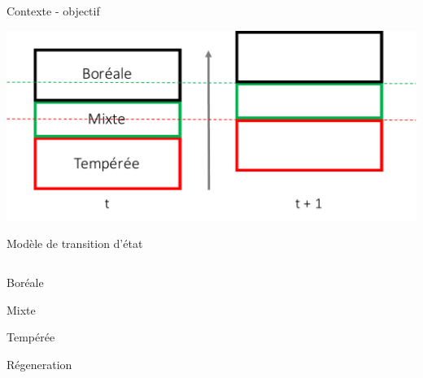 \documentclass[11pt, compress, aspectratio=1610]{beamer}
\providecommand{\tightlist}{%
  \setlength{\itemsep}{0pt}\setlength{\parskip}{0pt}}
\newcommand{\begincols}{\begin{columns}}
\newcommand{\stopcols}{\end{columns}}
\begin{document}
\begin{frame}{Contexte - objectif}
\protect\hypertarget{contexte---objectif}{}

\includegraphics[scale=0.65]{figures/migration.pdf}

\end{frame}

\begin{frame}{Modèle de transition d’état}
\protect\hypertarget{moduxe8le-de-transition-duxe9tat}{}

\begincols
{}
  
\hfill{}
\vspace{-5mm}

\begin{description}
\tightlist
\item[B]
Boréale
\item[M]
Mixte
\item[T]
Tempérée
\item[R]
Régeneration
\end{description}

\stopcols

\end{frame}
\end{document}
